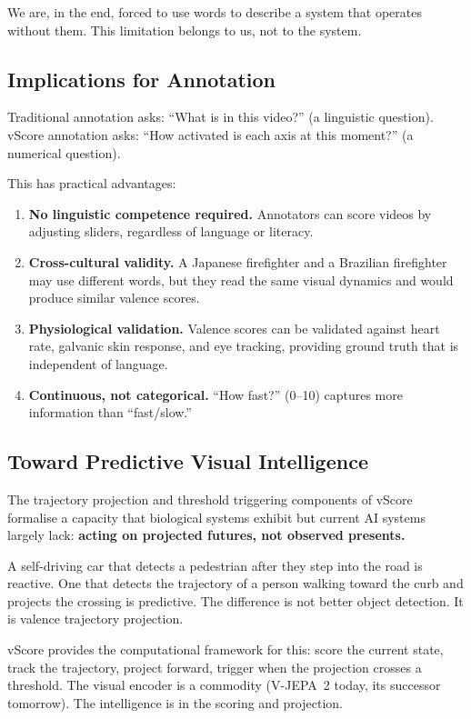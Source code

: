 \documentclass[11pt]{article}
\begin{document}
We are, in the end, forced to use words to describe a system that operates without them. This limitation belongs to us, not to the system.

\subsection{Implications for Annotation}

Traditional annotation asks: ``What is in this video?'' (a linguistic question). vScore annotation asks: ``How activated is each axis at this moment?'' (a numerical question).

This has practical advantages:

\begin{enumerate}
    \item \textbf{No linguistic competence required.} Annotators can score videos by adjusting sliders, regardless of language or literacy.
    \item \textbf{Cross-cultural validity.} A Japanese firefighter and a Brazilian firefighter may use different words, but they read the same visual dynamics and would produce similar valence scores.
    \item \textbf{Physiological validation.} Valence scores can be validated against heart rate, galvanic skin response, and eye tracking, providing ground truth that is independent of language.
    \item \textbf{Continuous, not categorical.} ``How fast?'' (0--10) captures more information than ``fast/slow.''
\end{enumerate}

\subsection{Toward Predictive Visual Intelligence}

The trajectory projection and threshold triggering components of vScore formalise a capacity that biological systems exhibit but current AI systems largely lack: \textbf{acting on projected futures, not observed presents.}

A self-driving car that detects a pedestrian after they step into the road is reactive. One that detects the trajectory of a person walking toward the curb and projects the crossing is predictive. The difference is not better object detection. It is valence trajectory projection.

vScore provides the computational framework for this: score the current state, track the trajectory, project forward, trigger when the projection crosses a threshold. The visual encoder is a commodity (V-JEPA~2 today, its successor tomorrow). The intelligence is in the scoring and projection.
\end{document}
